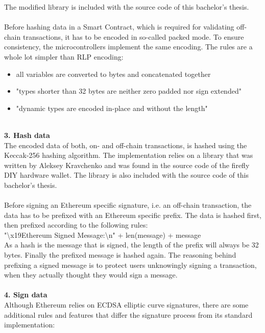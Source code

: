 The modified library is included with the source code of this bachelor's thesis.
\\\\
Before hashing data in a Smart Contract, which is required for validating off-chain transactions, it has to be encoded in so-called packed mode\cite{packed-spec}. To ensure consistency, the microcontrollers implement the same encoding. The rules are a whole lot simpler than RLP encoding:
\begin{itemize}
  \item all variables are converted to bytes and concatenated together
  \item "types shorter than 32 bytes are neither zero padded nor sign extended"\cite{packed-spec}
  \item "dynamic types are encoded in-place and without the length"\cite{packed-spec}
\end{itemize}
\leavevmode
\\
\textbf{3. Hash data}\\
The encoded data of both, on- and off-chain transactions, is hashed using the Keccak-256 hashing algorithm. The implementation relies on a library that was written by Aleksey Kravchenko and was found in the source code of the firefly DIY hardware wallet\cite{keccak-source}. The library is also included with the source code of this bachelor's thesis.
\\\\
Before signing an Ethereum specific signature, i.e. an off-chain transaction, the data has to be prefixed with an Ethereum specific prefix\cite{prefix}. The data is hashed first, then prefixed according to the following rules:
\\
"\textbackslash x19Ethereum Signed Message:\textbackslash n" + len(message) + message
\\
As a hash is the message that is signed, the length of the prefix will always be 32 bytes. Finally the prefixed message is hashed again. The reasoning behind prefixing a signed message is to protect users unknowingly signing a transaction, when they actually thought they would sign a message.
\\\\
\textbf{4. Sign data}\\
Although Ethereum relies on ECDSA elliptic curve signatures, there are some additional rules and features that differ the signature process from its standard implementation:
